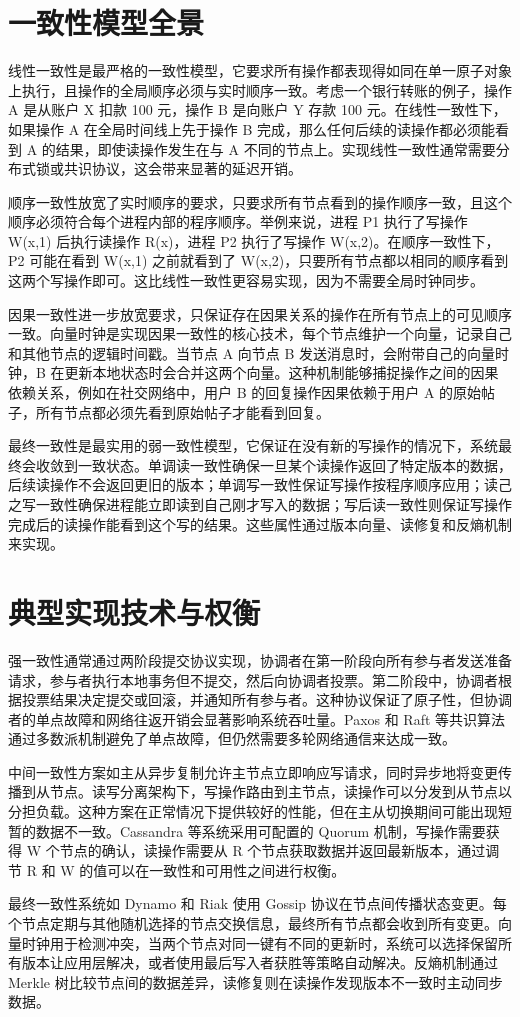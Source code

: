 \chapter{一致性模型全景}
线性一致性是最严格的一致性模型，它要求所有操作都表现得如同在单一原子对象上执行，且操作的全局顺序必须与实时顺序一致。考虑一个银行转账的例子，操作 A 是从账户 X 扣款 100 元，操作 B 是向账户 Y 存款 100 元。在线性一致性下，如果操作 A 在全局时间线上先于操作 B 完成，那么任何后续的读操作都必须能看到 A 的结果，即使读操作发生在与 A 不同的节点上。实现线性一致性通常需要分布式锁或共识协议，这会带来显著的延迟开销。\par
顺序一致性放宽了实时顺序的要求，只要求所有节点看到的操作顺序一致，且这个顺序必须符合每个进程内部的程序顺序。举例来说，进程 P1 执行了写操作 W(x,1) 后执行读操作 R(x)，进程 P2 执行了写操作 W(x,2)。在顺序一致性下，P2 可能在看到 W(x,1) 之前就看到了 W(x,2)，只要所有节点都以相同的顺序看到这两个写操作即可。这比线性一致性更容易实现，因为不需要全局时钟同步。\par
因果一致性进一步放宽要求，只保证存在因果关系的操作在所有节点上的可见顺序一致。向量时钟是实现因果一致性的核心技术，每个节点维护一个向量，记录自己和其他节点的逻辑时间戳。当节点 A 向节点 B 发送消息时，会附带自己的向量时钟，B 在更新本地状态时会合并这两个向量。这种机制能够捕捉操作之间的因果依赖关系，例如在社交网络中，用户 B 的回复操作因果依赖于用户 A 的原始帖子，所有节点都必须先看到原始帖子才能看到回复。\par
最终一致性是最实用的弱一致性模型，它保证在没有新的写操作的情况下，系统最终会收敛到一致状态。单调读一致性确保一旦某个读操作返回了特定版本的数据，后续读操作不会返回更旧的版本；单调写一致性保证写操作按程序顺序应用；读己之写一致性确保进程能立即读到自己刚才写入的数据；写后读一致性则保证写操作完成后的读操作能看到这个写的结果。这些属性通过版本向量、读修复和反熵机制来实现。\par
\chapter{典型实现技术与权衡}
强一致性通常通过两阶段提交协议实现，协调者在第一阶段向所有参与者发送准备请求，参与者执行本地事务但不提交，然后向协调者投票。第二阶段中，协调者根据投票结果决定提交或回滚，并通知所有参与者。这种协议保证了原子性，但协调者的单点故障和网络往返开销会显著影响系统吞吐量。Paxos 和 Raft 等共识算法通过多数派机制避免了单点故障，但仍然需要多轮网络通信来达成一致。\par
中间一致性方案如主从异步复制允许主节点立即响应写请求，同时异步地将变更传播到从节点。读写分离架构下，写操作路由到主节点，读操作可以分发到从节点以分担负载。这种方案在正常情况下提供较好的性能，但在主从切换期间可能出现短暂的数据不一致。Cassandra 等系统采用可配置的 Quorum 机制，写操作需要获得 W 个节点的确认，读操作需要从 R 个节点获取数据并返回最新版本，通过调节 R 和 W 的值可以在一致性和可用性之间进行权衡。\par
最终一致性系统如 Dynamo 和 Riak 使用 Gossip 协议在节点间传播状态变更。每个节点定期与其他随机选择的节点交换信息，最终所有节点都会收到所有变更。向量时钟用于检测冲突，当两个节点对同一键有不同的更新时，系统可以选择保留所有版本让应用层解决，或者使用最后写入者获胜等策略自动解决。反熵机制通过 Merkle 树比较节点间的数据差异，读修复则在读操作发现版本不一致时主动同步数据。\par
